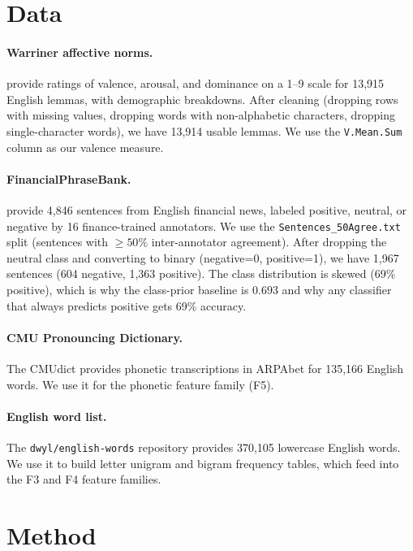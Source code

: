 \documentclass{article}
\begin{document}
\section{Data}

\paragraph{Warriner affective norms.}
\citet{warriner2013} provide ratings of valence, arousal, and dominance on a 1--9 scale for 13,915 English lemmas, with demographic breakdowns. After cleaning (dropping rows with missing values, dropping words with non-alphabetic characters, dropping single-character words), we have 13,914 usable lemmas. We use the \texttt{V.Mean.Sum} column as our valence measure.

\paragraph{FinancialPhraseBank.}
\citet{malo2014} provide 4,846 sentences from English financial news, labeled positive, neutral, or negative by 16 finance-trained annotators. We use the \texttt{Sentences\_50Agree.txt} split (sentences with $\geq 50\%$ inter-annotator agreement). After dropping the neutral class and converting to binary (negative=0, positive=1), we have 1,967 sentences (604 negative, 1,363 positive). The class distribution is skewed (69\% positive), which is why the class-prior baseline is 0.693 and why any classifier that always predicts positive gets 69\% accuracy.

\paragraph{CMU Pronouncing Dictionary.}
The CMUdict provides phonetic transcriptions in ARPAbet for 135,166 English words. We use it for the phonetic feature family (F5).

\paragraph{English word list.}
The \texttt{dwyl/english-words} repository provides 370,105 lowercase English words. We use it to build letter unigram and bigram frequency tables, which feed into the F3 and F4 feature families.

\section{Method}
\end{document}
